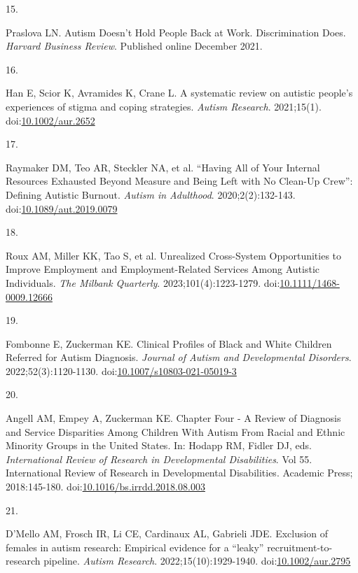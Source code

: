 \documentclass[
  letterpaper,
  DIV=11,
  numbers=noendperiod]{scrreprt}
\newlength{\cslhangindent}
\newlength{\csllabelwidth}
\newenvironment{CSLReferences}[2] %
 {\begin{list}{}{%
  \setlength{\itemindent}{0pt}
  \setlength{\leftmargin}{0pt}
  \setlength{\parsep}{0pt}
  \ifodd #1
   \setlength{\leftmargin}{\cslhangindent}
   \setlength{\itemindent}{-1\cslhangindent}
  \fi
  \setlength{\itemsep}{#2\baselineskip}}}
 {\end{list}}
\newcommand{\CSLLeftMargin}[1]{\parbox[t]{\csllabelwidth}{\strut#1\strut}}
\newcommand{\CSLRightInline}[1]{\parbox[t]{\linewidth - \csllabelwidth}{\strut#1\strut}}
\begin{document}
\begin{CSLReferences}{0}{1}
\CSLLeftMargin{15. }%
\CSLRightInline{Praslova LN. Autism {Doesn}'t {Hold People Back} at
{Work}. {Discrimination Does}. \emph{Harvard Business Review}. Published
online December 2021.}

\CSLLeftMargin{16. }%
\CSLRightInline{Han E, Scior K, Avramides K, Crane L. A systematic
review on autistic people's experiences of stigma and coping strategies.
\emph{Autism Research}. 2021;15(1).
doi:\href{https://doi.org/10.1002/aur.2652}{10.1002/aur.2652}}

\CSLLeftMargin{17. }%
\CSLRightInline{Raymaker DM, Teo AR, Steckler NA, et al. {``{Having All}
of {Your Internal Resources Exhausted Beyond Measure} and {Being Left}
with {No Clean-Up Crew}''}: {Defining Autistic Burnout}. \emph{Autism in
Adulthood}. 2020;2(2):132-143.
doi:\href{https://doi.org/10.1089/aut.2019.0079}{10.1089/aut.2019.0079}}

\CSLLeftMargin{18. }%
\CSLRightInline{Roux AM, Miller KK, Tao S, et al. Unrealized
{Cross-System Opportunities} to {Improve Employment} and
{Employment-Related Services Among Autistic Individuals}. \emph{The
Milbank Quarterly}. 2023;101(4):1223-1279.
doi:\href{https://doi.org/10.1111/1468-0009.12666}{10.1111/1468-0009.12666}}

\CSLLeftMargin{19. }%
\CSLRightInline{Fombonne E, Zuckerman KE. Clinical {Profiles} of {Black}
and {White Children Referred} for {Autism Diagnosis}. \emph{Journal of
Autism and Developmental Disorders}. 2022;52(3):1120-1130.
doi:\href{https://doi.org/10.1007/s10803-021-05019-3}{10.1007/s10803-021-05019-3}}

\CSLLeftMargin{20. }%
\CSLRightInline{Angell AM, Empey A, Zuckerman KE. Chapter {Four} - {A
Review} of {Diagnosis} and {Service Disparities Among Children With
Autism From Racial} and {Ethnic Minority Groups} in the {United States}.
In: Hodapp RM, Fidler DJ, eds. \emph{International {Review} of
{Research} in {Developmental Disabilities}}. Vol 55. International
{Review} of {Research} in {Developmental Disabilities}. Academic Press;
2018:145-180.
doi:\href{https://doi.org/10.1016/bs.irrdd.2018.08.003}{10.1016/bs.irrdd.2018.08.003}}

\CSLLeftMargin{21. }%
\CSLRightInline{D'Mello AM, Frosch IR, Li CE, Cardinaux AL, Gabrieli
JDE. Exclusion of females in autism research: {Empirical} evidence for a
{``leaky''} recruitment-to-research pipeline. \emph{Autism Research}.
2022;15(10):1929-1940.
doi:\href{https://doi.org/10.1002/aur.2795}{10.1002/aur.2795}}


\end{CSLReferences}
\end{document}
